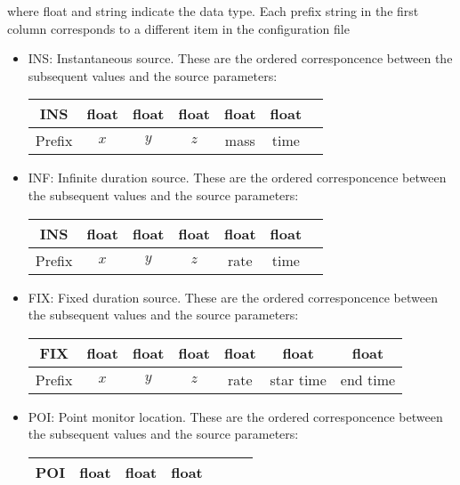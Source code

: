 \documentclass[]{article}
\begin{document}
\noindent where float and string indicate the data type. Each prefix string in the first
column corresponds to a different item in the configuration file
\begin{itemize}
    \item INS: Instantaneous source. These are the ordered corresponcence
    between the subsequent values and the source parameters:
    \begin{center}
        \begin{tabular}{|c|c|c|c|c|c|c|}\hline
            INS & float & float & float & float & float & \\\hline
            Prefix & $x$ & $y$ & $z$ & mass & time & \\\hline
        \end{tabular}
    \end{center}
    \item INF: Infinite duration source. These are the ordered corresponcence
    between the subsequent values and the source parameters:
    \begin{center}
        \begin{tabular}{|c|c|c|c|c|c|c|}\hline
            INS & float & float & float & float & float & \\\hline
            Prefix & $x$ & $y$ & $z$ & rate & time & \\\hline
        \end{tabular}
    \end{center}
    \item FIX: Fixed duration source. These are the ordered corresponcence
    between the subsequent values and the source parameters:
    \begin{center}
        \begin{tabular}{|c|c|c|c|c|c|c|}\hline
            FIX & float & float & float & float & float & float \\\hline
            Prefix & $x$ & $y$ & $z$ & rate & star time & end time\\\hline
        \end{tabular}
    \end{center}
    \item POI: Point monitor location. These are the ordered corresponcence
    between the subsequent values and the source parameters:
    \begin{center}
        \begin{tabular}{|c|c|c|c|c|c|c|}\hline
            POI & float & float & float &  &  & \\\hline

\end{tabular}
\end{center}
\end{itemize}
\end{document}
